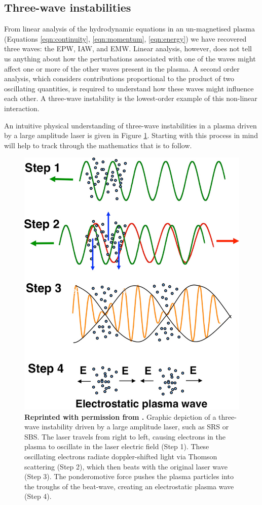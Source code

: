 \subsection{Three-wave instabilities}
From linear analysis of the hydrodynamic equations in an un-magnetised plasma (Equations \ref{eqn:continuity}, \ref{eqn:momentum}, \ref{eqn:energy}) we have recovered three waves: the \acrshort{EPW}, \acrshort{IAW}, and \acrshort{EMW}. Linear analysis, however, does not tell us anything about how the perturbations associated with one of the waves might affect one or more of the other waves present in the plasma. A second order analysis, which considers contributions proportional to the product of two oscillating quantities, is required to understand how these waves might influence each other. A three-wave instability is the lowest-order example of this non-linear interaction.

An intuitive physical understanding of three-wave instabilities in a plasma driven by a large amplitude laser is given in Figure \ref{fig:LPI_graphic}. Starting with this process in mind will help to track through the mathematics that is to follow.

\begin{figure}[ht]
   \centering
    \includegraphics[width=0.5\columnwidth]{Chapters/C2_Theory/LPI_graphic.png}
    \caption{\textbf{Reprinted with permission from \citet{Montgomery2012}.} Graphic depiction of a three-wave instability driven by a large amplitude laser, such as \acrshort{SRS} or \acrshort{SBS}. The laser travels from right to left, causing electrons in the plasma to oscillate in the laser electric field (Step 1). These oscillating electrons radiate doppler-shifted light via Thomson scattering (Step 2), which then beats with the original laser wave (Step 3). The ponderomotive force pushes the plasma particles into the troughs of the beat-wave, creating an electrostatic plasma wave (Step 4).}
    \label{fig:LPI_graphic}
\end{figure}{}


